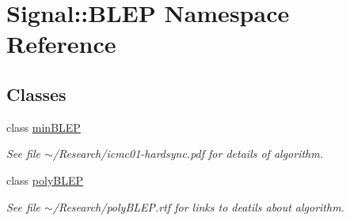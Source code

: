 \hypertarget{namespaceSignal_1_1BLEP}{\section{Signal\+:\+:B\+L\+E\+P Namespace Reference}
\label{namespaceSignal_1_1BLEP}
}
\subsection*{Classes}
\begin{DoxyCompactItemize}
\item 
class \hyperlink{classSignal_1_1BLEP_1_1minBLEP}{min\+B\+L\+E\+P}
\begin{DoxyCompactList}\small\item\em See file $\sim$/\+Research/icmc01-\/hardsync.pdf for details of algorithm. \end{DoxyCompactList}\item 
class \hyperlink{classSignal_1_1BLEP_1_1polyBLEP}{poly\+B\+L\+E\+P}
\begin{DoxyCompactList}\small\item\em See file $\sim$/\+Research/poly\+B\+L\+E\+P.rtf for links to deatils about algorithm. \end{DoxyCompactList}\end{DoxyCompactItemize}
